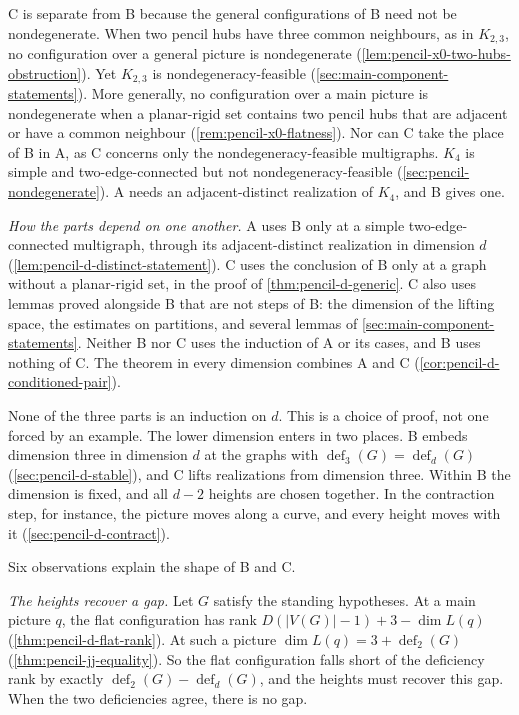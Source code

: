C is separate from B because the general configurations of B need not be
nondegenerate. When two pencil hubs have three common neighbours, as in
$K_{2,3}$, no configuration over a general picture is nondegenerate
(\cref{lem:pencil-x0-two-hubs-obstruction}). Yet $K_{2,3}$ is
nondegeneracy-feasible (\cref{sec:main-component-statements}). More
generally, no configuration over a main picture is nondegenerate when a
planar-rigid set contains two pencil hubs that are adjacent or have a
common neighbour (\cref{rem:pencil-x0-flatness}). Nor can C
take the place of B in A, as C concerns only the nondegeneracy-feasible
multigraphs. $K_4$ is simple and two-edge-connected but not
nondegeneracy-feasible (\cref{sec:pencil-nondegenerate}). A needs an
adjacent-distinct realization of $K_4$, and B gives one.

\emph{How the parts depend on one another.} A uses B only at a simple
two-edge-connected multigraph, through its adjacent-distinct realization
in dimension $d$ (\cref{lem:pencil-d-distinct-statement}). C
uses the conclusion of B only at a graph without a planar-rigid set, in
the proof of \cref{thm:pencil-d-generic}. C also uses lemmas proved
alongside B that are not steps of B: the dimension of the lifting space,
the estimates on partitions, and several lemmas of
\cref{sec:main-component-statements}. Neither B nor C uses the induction
of A or its cases, and B uses nothing of C. The theorem in every
dimension combines A and C (\cref{cor:pencil-d-conditioned-pair}).

None of the three parts is an induction on $d$. This is a choice of
proof, not one forced by an example. The lower dimension enters in two
places. B embeds dimension three in dimension $d$ at the graphs with
$\operatorname{def}_3(G) = \operatorname{def}_d(G)$
(\cref{sec:pencil-d-stable}), and C lifts realizations from dimension
three. Within B the dimension is fixed, and all $d - 2$ heights are
chosen together. In the contraction step, for instance, the picture
moves along a curve, and every height moves with it
(\cref{sec:pencil-d-contract}).

Six observations explain the shape of B and C.

\emph{The heights recover a gap.} Let $G$ satisfy the standing
hypotheses. At a main picture $q$, the flat configuration has rank
$D(|V(G)| - 1) + 3 - \dim L(q)$ (\cref{thm:pencil-d-flat-rank}). At such
a picture $\dim L(q) = 3 + \operatorname{def}_2(G)$
(\cref{thm:pencil-jj-equality}). So the flat configuration falls short
of the deficiency rank by exactly $\operatorname{def}_2(G) -
\operatorname{def}_d(G)$, and the heights must recover this gap. When
the two deficiencies agree, there is no gap.

